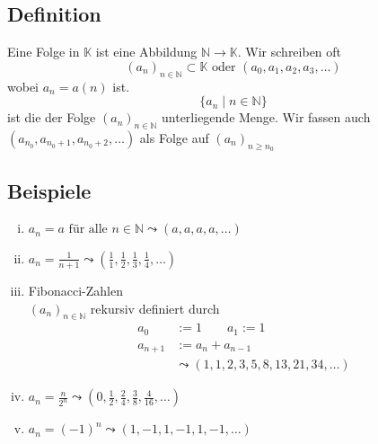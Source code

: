 \subsection{Definition} %
\label{sub:definition}
Eine Folge in $\mathds{K}$ ist eine Abbildung $\mathds{N} \to \mathds{K}$. Wir schreiben oft
\[
	(a_n)_{n \in \mathds{N}} \subset \mathds{K} \text{ oder } (a_0, a_1, a_2, a_3, \ldots)
\]
wobei $a_n = a(n)$ ist.
\[
	\{ a_n  \mid n \in \mathds{N} \}
\]
ist die der Folge $(a_n)_{n \in \mathds{N}}$ unterliegende Menge. 
Wir fassen auch $(a_{n_0}, a_{n_0 +1}, a_{n_0 +2}, \ldots )$ als Folge auf $(a_n)_{n \geq n_0}$
\subsection{Beispiele} %
\label{sub:beispiele}
\begin{enumerate}[(i)]
	\item $a_n = a \text{ für alle } n \in \mathds{N} \leadsto (a, a, a, a, \ldots )$
	\item $a_n = \frac{1}{n+1} \leadsto (\frac{1}{1}, \frac{1}{2}, \frac{1}{3}, \frac{1}{4}, \ldots )$
	\item Fibonacci-Zahlen \\
	$(a_n)_{n \in \mathds{N} }$ rekursiv definiert durch 
	\begin{align*}
		a_0 &:= 1 \qquad a_1 := 1 \\
		a_{n+1} &:= a_n + a_{n-1} \\
		&\leadsto (1,1,2,3,5,8,13,21,34, \ldots )
	\end{align*}
	\item $a_n = \frac{n}{2^n} \leadsto (0, \frac{1}{2}, \frac{2}{4}, \frac{3}{8}, \frac{4}{16}, \ldots )$
	\item $a_n = (-1)^n \leadsto (1, -1, 1, -1 , 1, -1, \ldots )$
\end{enumerate}

